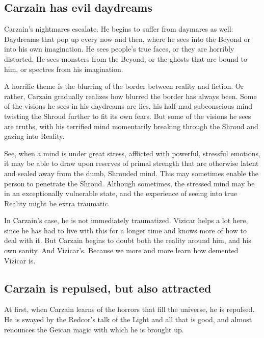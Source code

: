 \subsection{Carzain has evil daydreams}
Carzain's nightmares escalate. He begins to suffer from daymares as well: Daydreams that pop up every now and then, where he sees into the Beyond or into his own imagination. He sees people's true faces, or they are horribly distorted. He sees monsters from the Beyond, or the ghosts that are bound to him, or spectres from his imagination. 

A horrific theme is the blurring of the border between reality and fiction. Or rather, Carzain gradually realizes how blurred the border has always been. Some of the visions he sees in his daydreams are lies, his half-mad subconscious mind twisting the Shroud further to fit its own fears. But some of the visions he sees are truths, with his terrified mind momentarily breaking through the Shroud and gazing into Reality. 

See, when a mind is under great stress, afflicted with powerful, stressful emotions, it may be able to draw upon reserves of primal strength that are otherwise latent and sealed away from the dumb, Shrouded mind. This may sometimes enable the person to penetrate the Shroud. Although sometimes, the stressed mind may be in an exceptionally vulnerable state, and the experience of seeing into true Reality might be extra traumatic. 

In Carzain's case, he is not immediately traumatized. Vizicar helps a lot here, since he has had to live with this for a longer time and knows more of how to deal with it. But Carzain begins to doubt both the reality around him, and his own sanity. And Vizicar's. Because we more and more learn how demented Vizicar is. 










\subsection{Carzain is repulsed, but also attracted}
At first, when Carzain learns of the horrors that fill the universe, he is repulsed. He is swayed by the Redcor's talk of the Light and all that is good, and almost renounces the  Geican magic with which he is brought up. 

